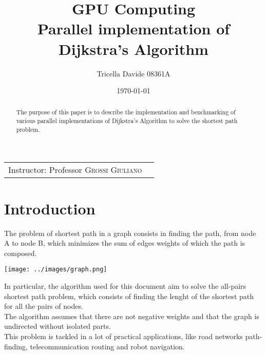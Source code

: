 \documentclass[
	letterpaper, %
	10pt, %
]{class}
\title{GPU Computing\\Parallel implementation of Dijkstra's Algorithm} %
\author{Tricella Davide 08361A} %
\date{\today} %
\begin{document}
\maketitle %

\begin{center}
    \begin{tabular}{l r}
        Instructor: Professor \textsc{Grossi Giuliano}
    \end{tabular}
\end{center}


\begin{abstract}
    The purpose of this paper is to describe the implementation and benchmarking of various parallel implementations of Dijkstra's Algorithm to solve the shortest path problem.
\end{abstract}


\tableofcontents


\section{Introduction}

The problem of shortest path in a graph consists in finding the path, from node A to node B,
which minimizes the sum of edges weights of which the path is composed.\\

\begin{center}
    \texttt{[image: ../images/graph.png]}
\end{center}

In particular, the algorithm used for this document aim to solve the all-pairs shortest path problem,
which consists of finding the lenght of the shortest path for all the pairs of nodes.\\

The algorithm assumes that there are not negative weights and that the graph is undirected without isolated parts.\\

This problem is tackled in a lot of practical applications, like road networks path-finding, telecommunication routing and robot navigation.

\printbibliography %

\end{document}
